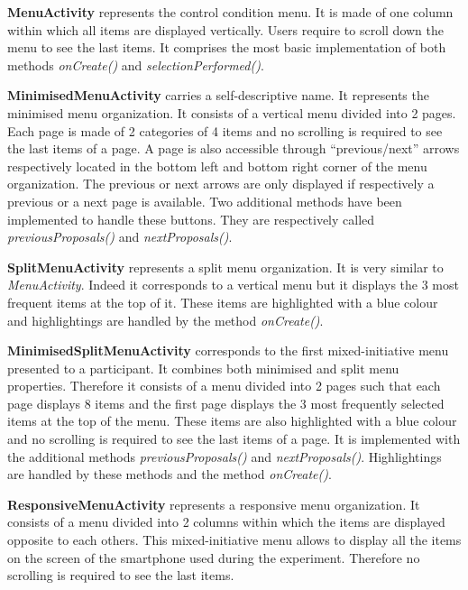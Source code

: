 \textbf{MenuActivity} represents the control condition menu. It is made of 
one column within which all items are displayed vertically. Users require to 
scroll down the menu to see the last items. It comprises the most basic 
implementation of both methods \textit{onCreate()} and 
\textit{selectionPerformed()}.\newline

\textbf{MinimisedMenuActivity} carries a self-descriptive name. It 
represents the minimised menu organization. It consists of a vertical menu 
divided into 2 pages. Each page is made of 2 categories of 4 items and no 
scrolling is required to see the last items of a page. A page is 
also accessible through \enquote{previous/next} arrows respectively located in 
the bottom left and bottom right corner of the menu organization. The previous 
or next arrows are only displayed if respectively a previous or a next page 
is available. Two additional methods have been implemented to handle these 
buttons. They are respectively called \textit{previousProposals()} and 
\textit{nextProposals()}.\newline

\textbf{SplitMenuActivity} represents a split menu organization. It is very 
similar to \textit{MenuActivity}. Indeed it corresponds to a 
vertical menu but it displays the 3 most frequent items at the top of it. These 
items are highlighted with a blue colour and highlightings are handled by the 
method \textit{onCreate()}.\newline

\textbf{MinimisedSplitMenuActivity} corresponds to the first 
mixed-initiative menu presented to a participant. It combines both 
minimised and split menu properties. Therefore it consists of a menu 
divided into 2 pages such that each page displays 8 items and the first 
page displays the 3 most frequently selected items at the top of the menu. 
These items are also highlighted with a blue colour and no scrolling is 
required to see the last items of a page. It is implemented with the 
additional methods \textit{previousProposals()} and 
\textit{nextProposals()}. Highlightings are handled by these methods 
and the method \textit{onCreate()}.\newline

\textbf{ResponsiveMenuActivity} represents a responsive menu 
organization. It consists of a menu divided into 2 columns within 
which the items are displayed opposite to each others. This mixed-initiative 
menu allows to display all the items on the screen of the smartphone used 
during the experiment. Therefore no scrolling is required to see the last 
items.\newline

